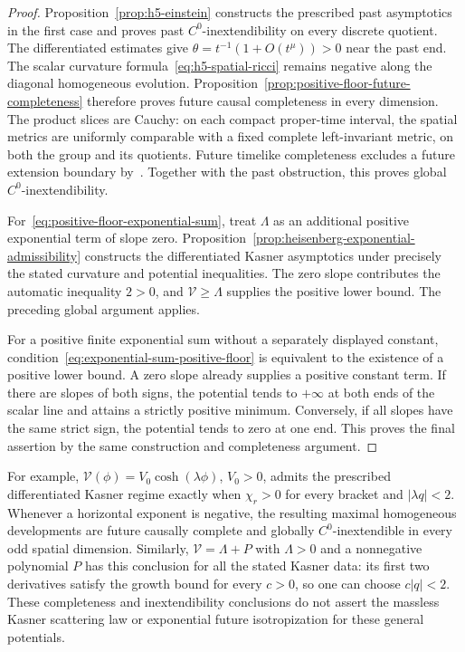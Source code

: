\documentclass[10pt,a4paper]{article}
\numberwithin{equation}{section}
\theoremstyle{definition}
\theoremstyle{remark}
\begin{document}
\begin{proof}
Proposition~\ref{prop:h5-einstein} constructs the prescribed past
asymptotics in the first case and proves past $C^0$-inextendibility
on every discrete quotient.  The differentiated estimates give
$\theta=t^{-1}(1+O(t^\mu))>0$ near the past end.  The scalar
curvature formula~\eqref{eq:h5-spatial-ricci} remains negative along
the diagonal homogeneous evolution.  Proposition~\ref{prop:positive-floor-future-completeness}
therefore proves future causal completeness in every dimension.
The product slices are Cauchy: on each compact proper-time interval,
the spatial metrics are uniformly comparable with a fixed complete
left-invariant metric, on both the group and its quotients.
Future timelike completeness excludes a future extension boundary
by~\cite{GLS2018}.  Together with the past obstruction, this proves
global $C^0$-inextendibility.

For~\eqref{eq:positive-floor-exponential-sum}, treat $\Lambda$ as
an additional positive exponential term of slope zero.
Proposition~\ref{prop:heisenberg-exponential-admissibility} constructs
the differentiated Kasner asymptotics under precisely the stated
curvature and potential inequalities.  The zero slope contributes
the automatic inequality $2>0$, and $\mathcal V\ge\Lambda$ supplies
the positive lower bound.  The preceding global argument applies.

For a positive finite exponential sum without a separately displayed
constant, condition~\eqref{eq:exponential-sum-positive-floor} is
equivalent to the existence of a positive lower bound.  A zero slope
already supplies a positive constant term.  If there are slopes of
both signs, the potential tends to $+\infty$ at both ends of the
scalar line and attains a strictly positive minimum.  Conversely,
if all slopes have the same strict sign, the potential tends to zero
at one end.  This proves the final assertion by the same construction
and completeness argument.
\end{proof}

For example, $\mathcal V(\phi)=V_0\cosh(\lambda\phi)$, $V_0>0$,
admits the prescribed differentiated Kasner regime exactly when
$\chi_r>0$ for every bracket and $|\lambda q|<2$.
Whenever a horizontal exponent is negative, the resulting maximal
homogeneous developments are future causally complete and globally
$C^0$-inextendible in every odd spatial dimension.
Similarly, $\mathcal V=\Lambda+P$ with $\Lambda>0$ and a
nonnegative polynomial $P$ has this conclusion for all the stated
Kasner data: its first two derivatives satisfy the growth bound for
every $c>0$, so one can choose $c|q|<2$.
These completeness and inextendibility conclusions do not assert
the massless Kasner scattering law or exponential future
isotropization for these general potentials.
\end{document}
